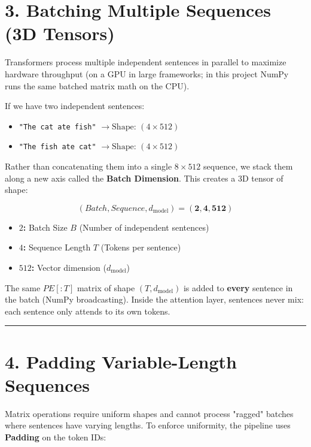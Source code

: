 \documentclass[11pt,a4paper,oneside]{report}
\providecommand{\tightlist}{\setlength{\itemsep}{0pt}\setlength{\parskip}{0pt}}
\begin{document}
\section{3. Batching Multiple Sequences (3D Tensors)}\label{3-batching-multiple-sequences-3d-tensors}

Transformers process multiple independent sentences in parallel to maximize hardware throughput (on a GPU in large frameworks; in this project NumPy runs the same batched matrix math on the CPU).

If we have two independent sentences:

\begin{itemize}
\tightlist
\item
  \texttt{"The\ cat\ ate\ fish"} \(\rightarrow \text{Shape: } (4 \times 512)\)
\item
  \texttt{"The\ fish\ ate\ cat"} \(\rightarrow \text{Shape: } (4 \times 512)\)
\end{itemize}

Rather than concatenating them into a single \(8 \times 512\) sequence, we stack them along a new axis called the \textbf{Batch Dimension}. This creates a 3D tensor of shape:

\[(Batch, Sequence, d_{\text{model}}) = \mathbf{(2, 4, 512)}\]

\begin{itemize}
\tightlist
\item
  \textbf{\(2\):} Batch Size \(B\) (Number of independent sentences)
\item
  \textbf{\(4\):} Sequence Length \(T\) (Tokens per sentence)
\item
  \textbf{\(512\):} Vector dimension (\(d_{\text{model}}\))
\end{itemize}

The same \(PE[:T]\) matrix of shape \((T, d_{\text{model}})\) is added to \textbf{every} sentence in the batch (NumPy broadcasting). Inside the attention layer, sentences never mix: each sentence only attends to its own tokens.

\begin{center}\rule{0.5\linewidth}{0.5pt}\end{center}

\section{4. Padding Variable-Length Sequences}\label{4-padding-variable-length-sequences}

Matrix operations require uniform shapes and cannot process "ragged" batches where sentences have varying lengths. To enforce uniformity, the pipeline uses \textbf{Padding} on the token IDs:
\end{document}
